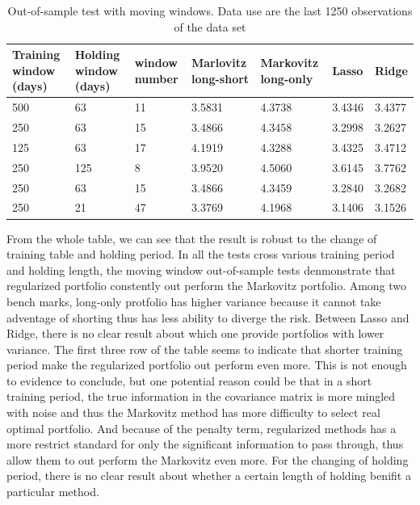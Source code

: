 \documentclass{article}
\begin{document}
\begin{table}[H]
    \caption{Out-of-sample test with moving windows. Data use are the last 1250
    observations of the data set}
    \begin{center}\begin{tabular}{|l|l|l|l|l|l|l|}
    \hline
    Training window (days) & Holding window (days) & window number & Marlovitz long-short & Markovitz long-only & Lasso & Ridge \\ \hline
    500 & 63 & 11  & 3.5831 & 4.3738 & 3.4346 & 3.4377 \\ \hline
    250 & 63 & 15  & 3.4866 & 4.3458 & 3.2998 & 3.2627 \\ \hline
    125 & 63 & 17  & 4.1919 & 4.3288 & 3.4325 & 3.4712 \\ \hline
    250 & 125 & 8  & 3.9520 & 4.5060 & 3.6145 & 3.7762 \\ \hline
    250 & 63 & 15  & 3.4866 & 4.3459 & 3.2840 & 3.2682 \\ \hline
    250 & 21 & 47  & 3.3769 & 4.1968 & 3.1406 & 3.1526 \\ \hline
    \end{tabular}\end{center}
\end{table}

From the whole table, we can see that the result is robust to the change of
training table and holding period. In all the tests cross various training period
and holding length, the moving window out-of-sample tests denmonstrate that
regularized portfolio constently out perform the Markovitz portfolio. Among
two bench marks, long-only protfolio has higher variance because it cannot
take adventage of shorting thus has less ability to diverge the risk. Between
Lasso and Ridge, there is no clear result about which one provide portfolios
with lower variance. The first three row of the table seems to indicate that
shorter training period make the regularized portfolio out perform even more.
This is not enough to evidence to conclude, but one potential reason could be
that in a short training period, the true information in the covariance matrix
is more mingled with noise and thus the Markovitz method has more difficulty
to select real optimal portfolio. And because of the penalty term, regularized
methods has a more restrict standard for only the significant information to
pass through, thus allow them to out perform the Markovitz even more. For the
changing of holding period, there is no clear result about whether a certain
length of holding benifit a particular method.
\end{document}
